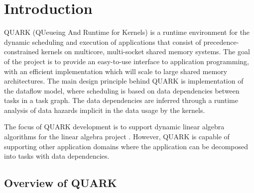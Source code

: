 \documentclass[11pt,letterpaper]{report}
\begin{document}

\chapter{Introduction}

QUARK (QUeueing And Runtime for Kernels) is a runtime environment for
the dynamic scheduling and execution of applications that consist of
precedence-constrained kernels on multicore, \mbox{multi-socket}
shared memory systems.  The goal of the project is to provide an
easy-to-use interface to application programming, with an efficient
implementation which will scale to large shared memory architectures.
The main design principle behind QUARK is implementation of the
dataflow model, where scheduling is based on data dependencies between
tasks in a task graph.  The data dependencies are inferred through a
runtime analysis of data hazards implicit in the data usage by the
kernels.

The focus of QUARK development is to support dynamic linear algebra
algorithms for the \PLASMA linear algebra project
\cite{Agullo:2010:PLASMA-Users}.  However, QUARK is capable of
supporting other application domains where the application can be
decomposed into tasks with data dependencies.


\section{Overview of QUARK}
\end{document}
